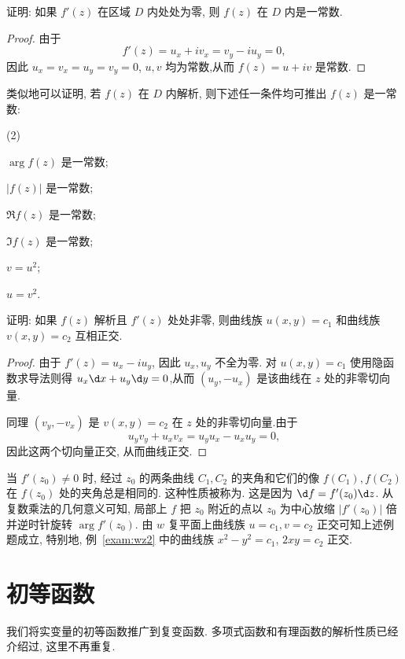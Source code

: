 \begin{example}\label{exam:zero-deriv-constant}
  证明: 如果 $f'(z)$ 在区域 $D$ 内处处为零, 则 $f(z)$ 在 $D$ 内是一常数.
\end{example}

\begin{proof}
  由于
    \[f'(z)=u_x+iv_x=v_y-iu_y=0,\]
  因此 $u_x=v_x=u_y=v_y=0$, $u,v$ 均为常数,从而  $f(z)=u+iv$ 是常数.
\end{proof}
类似地可以证明, 若 $f(z)$ 在 $D$ 内解析, 则下述任一条件均可推出 $f(z)$ 是一常数:
\begin{tasksexam}(2)
  \item {$\arg{f(z)}$ 是一常数;}
  \item {$|f(z)|$ 是一常数;}
  \item {$\Re{f(z)}$ 是一常数;}
  \item {$\Im{f(z)}$ 是一常数;}
  \item {$v=u^2$;}
  \item {$u=v^2$.}
\end{tasksexam}

\begin{example}
  证明: 如果 $f(z)$ 解析且 $f'(z)$ 处处非零, 则曲线族 $u(x,y)=c_1$ 和曲线族 $v(x,y)=c_2$ 互相正交.
\end{example}

\begin{proof}
  由于 $f'(z)=u_x-iu_y$, 因此 $u_x,u_y$ 不全为零.
  对 $u(x,y)=c_1$ 使用隐函数求导法则得 $u_x\d x+u_y\d y=0$,从而 $(u_y,-u_x)$ 是该曲线在 $z$ 处的非零切向量.

  同理 $(v_y,-v_x)$ 是 $v(x,y)=c_2$ 在 $z$ 处的非零切向量.由于
    \[u_yv_y+u_xv_x=u_yu_x-u_xu_y=0,\]
  因此这两个切向量正交, 从而曲线正交.
\end{proof}

当 $f'(z_0)\neq 0$ 时, 经过 $z_0$ 的两条曲线 $C_1,C_2$ 的夹角和它们的像 $f(C_1),f(C_2)$ 在 $f(z_0)$ 处的夹角总是相同的.
这种性质被称为.
这是因为 $\d f=f'(z_0)\d z$.
从复数乘法的几何意义可知, 局部上 $f$ 把 $z_0$ 附近的点以 $z_0$ 为中心放缩 $|f'(z_0)|$ 倍并逆时针旋转 $\arg{f'(z_0)}$.
由 $w$ 复平面上曲线族 $u=c_1,v=c_2$ 正交可知上述例题成立, 特别地, 例~\ref{exam:wz2} 中的曲线族 $x^2-y^2=c_1$, $2xy=c_2$ 正交.


\section{初等函数}
\label{sec:elementary-functions}

我们将实变量的初等函数推广到复变函数.
多项式函数和有理函数的解析性质已经介绍过, 这里不再重复.

